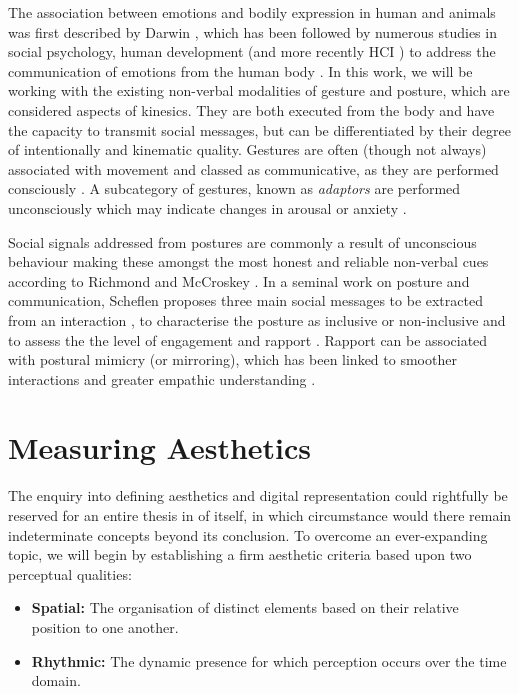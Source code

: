 The association between emotions and bodily expression in human and animals was first described by Darwin \cite{darwin_expression_2013}, which has been followed by numerous studies in social psychology, human development (and more recently HCI \cite{alaoui_movement_2012, gillies_creating_2018, fdili_alaoui_strategies_2015}) to address the communication of emotions from the human body \cite{gunes_lab_2008}. In this work, we will be working with the existing non-verbal modalities of gesture and posture, which are considered aspects of kinesics. They are both executed from the body and have the capacity to transmit social messages, but can be differentiated by their degree of intentionally and kinematic quality. Gestures are often (though not always) associated with movement and classed as communicative, as they are performed consciously \cite{vinciarelli_towards_2011}. A subcategory of gestures, known as \textit{adaptors} are performed unconsciously which may indicate changes in arousal or anxiety \cite{hans_kinesics_2015, neff_dont_2011}.

Social signals addressed from postures are commonly a result of unconscious behaviour making these amongst the most honest and reliable non-verbal cues according to Richmond and McCroskey \cite{richmond_nonverbal_2011}. In a seminal work on posture and communication, Scheflen proposes three main social messages to be extracted from an interaction \cite{scheflen_significance_1964}, to characterise the posture as inclusive or non-inclusive and to assess the the level of engagement and rapport \cite{vinciarelli_social_2009}. Rapport can be associated with postural mimicry (or mirroring), which has been linked to smoother interactions and greater empathic understanding \cite{chartrand_chameleon_1999}.

\section {Measuring Aesthetics}

The enquiry into defining aesthetics and digital representation could rightfully be reserved for an entire thesis in of itself, in which circumstance would there remain indeterminate concepts beyond its conclusion. To overcome an ever-expanding topic, we will begin by establishing a firm aesthetic criteria based upon two perceptual qualities:

\begin{itemize}
    \item \textbf{Spatial:} The organisation of distinct elements based on their relative position to one another.
    \item \textbf{Rhythmic:} The dynamic presence for which perception occurs over the time domain.
\end{itemize}

